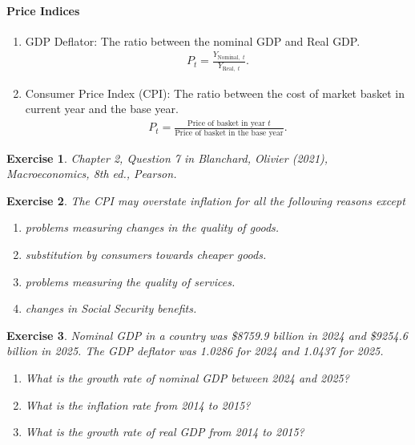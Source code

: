 \documentclass[12pt]{article}
\newtheorem{exercise}{Exercise}
\numberwithin{equation}{section}
\begin{document}
\paragraph{Price Indices}
\begin{enumerate}[label=(\arabic*)]
    \item GDP Deflator: The ratio between the nominal GDP and Real GDP.
    \begin{align*}
        P_t = \frac{Y_{\text{Nominal, }\, t}}{Y_{\text{Real, }\, t}}.
    \end{align*}
    \item Consumer Price Index (CPI): The ratio between the cost of market basket in current year and the base year.
    \begin{align*}
        P_t = \frac{\text{Price of basket in year } t}{\text{Price of basket in the base year}}.
    \end{align*}
\end{enumerate}

\begin{exercise}
    Chapter 2, Question 7 in Blanchard, Olivier (2021), \textit{Macroeconomics}, 8th ed., Pearson.
\end{exercise}

\begin{exercise}
    The CPI may overstate inflation for all the following reasons except
    \begin{enumerate}[label=\Alph*.]
        \item problems measuring changes in the quality of goods.
        \item substitution by consumers towards cheaper goods.
        \item problems measuring the quality of services.
        \item changes in Social Security benefits.
    \end{enumerate}
\end{exercise}

\begin{exercise}
    Nominal GDP in a country was \$8759.9 billion in 2024 and \$9254.6 billion in 2025. The GDP deflator was 1.0286 for 2024 and 1.0437 for 2025.
    \begin{enumerate}[label=(\roman*)]
        \item What is the growth rate of nominal GDP between 2024 and 2025?
        \item What is the inflation rate from 2014 to 2015?
        \item What is the growth rate of real GDP from 2014 to 2015?
    \end{enumerate}
\end{exercise}
\end{document}
